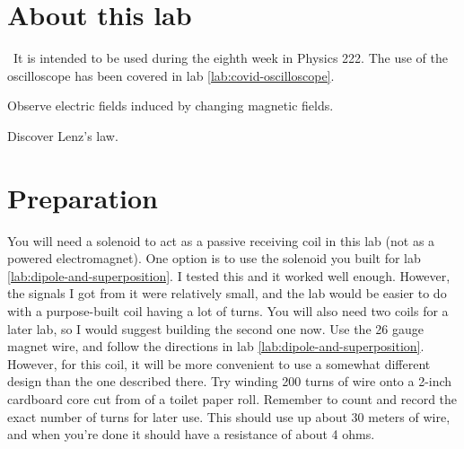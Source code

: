 \renewcommand\thechapter{c2.8a}
\label{lab:covid-electromagnetism}

\section*{About this lab}

\covid\ 
It is intended to be used during the eighth week in Physics 222.
The use of the oscilloscope has been covered in lab \ref{lab:covid-oscilloscope}.

\apparatus
{}
\equip{tape (not included in kit)}

\begin{goals}

\item[] Observe electric fields induced by changing magnetic fields.

\item[] Discover Lenz's law.

\end{goals}

\section*{Preparation}

You will need a solenoid to act as a passive receiving coil in this lab (not as a powered electromagnet).
One option is to use the solenoid you built for lab \ref{lab:dipole-and-superposition}. I tested this
and it worked well enough. However, the signals I got from it were relatively small, and the lab would
be easier to do with a purpose-built coil having a lot of turns. You will also need two coils for
a later lab, so I would suggest building the second one now. Use the 26 gauge magnet wire, and follow
the directions in lab \ref{lab:dipole-and-superposition}. However, for this coil, it will be more
convenient to use a somewhat different design than the one described there. Try winding 200 turns of
wire onto a 2-inch cardboard core cut from of a toilet paper roll. Remember to count and record the
exact number of turns for later use. This should use up about 30 meters of wire, and when you're
done it should have a resistance of about 4 ohms.

\introduction

